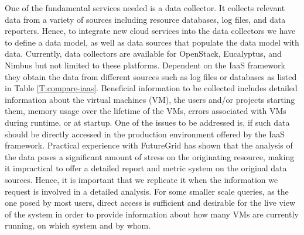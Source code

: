 \documentclass{tex/sig-alternate-2013}
\begin{document}
{One of the fundamental services needed is a data collector. It collects relevant data from a variety of sources including resource databases, log files, and data reporters. Hence, to integrate new cloud services into the data collectors we have to define a data model, as well as data sources that populate the data model with data. Currently, data collectors are available for OpenStack, Eucalyptus, and Nimbus but not limited to these platforms. Dependent on the IaaS framework they obtain the data from different sources such as log files or databases as listed in Table \ref{T:compare-iaas}. Beneficial information to be collected includes detailed information about the virtual machines (VM), the users and/or projects starting them, memory usage over the lifetime of the VMs, errors associated with VMs during runtime, or at startup. One of the issues to be addressed is, if such data should be directly accessed in the production environment offered by the IaaS framework. Practical experience with FutureGrid has shown that the analysis of the data poses a significant amount of stress on the originating resource, making it impractical to offer a detailed report and metric system on the original data sources. Hence, it is important that we replicate it when the information we request is involved in a detailed analysis. For some smaller scale queries, as the one posed by most users, direct access is sufficient and desirable for the live view of the system in order to provide information about how many VMs are currently running, on which system and by whom.

\newcommand{\YES}{\ding{51}}
\newcommand{\NO}{\ding{55}}


}
\end{document}
